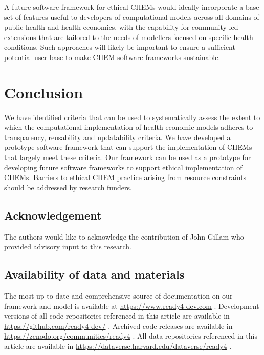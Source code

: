 \documentclass[sn-vancouver,Numbered,pdflatex]{sn-jnl}
\theoremstyle{remark}
\theoremstyle{definition}
\begin{document}
A future software framework for ethical CHEMs would ideally incorporate a base set of features useful to developers of computational models across all domains of public health and health economics, with the capability for community-led extensions that are tailored to the needs of modellers focused on specific health-conditions. Such approaches will likely be important to ensure a sufficient potential user-base to make CHEM software frameworks sustainable.

\hypertarget{conclusion}{%
\section{Conclusion}\label{conclusion}}

We have identified criteria that can be used to systematically assess the extent to which the computational implementation of health economic models adheres to transparency, reusability and updatability criteria. We have developed a prototype software framework that can support the implementation of CHEMs that largely meet these criteria. Our framework can be used as a prototype for developing future software frameworks to support ethical implementation of CHEMs. Barriers to ethical CHEM practice arising from resource constraints should be addressed by research funders.

\hypertarget{acknowledgement}{%
\subsection*{Acknowledgement}\label{acknowledgement}}

The authors would like to acknowledge the contribution of John Gillam who provided advisory input to this research.

\hypertarget{availability-of-data-and-materials}{%
\subsection*{Availability of data and materials}\label{availability-of-data-and-materials}}

The most up to date and comprehensive source of documentation on our framework and model is available at \url{https://www.ready4-dev.com} . Development versions of all code repositories referenced in this article are available in \url{https://github.com/ready4-dev/} . Archived code releases are available in \url{https://zenodo.org/communities/ready4} . All data repositories referenced in this article are available in \url{https://dataverse.harvard.edu/dataverse/ready4} .
\end{document}

